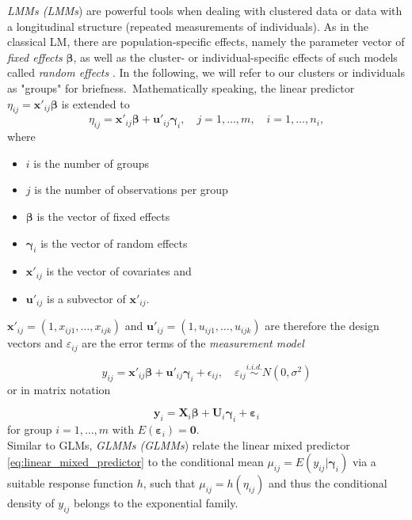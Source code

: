 \textit{\acl{LMM}s (\acs{LMM}s}) are powerful tools when dealing with clustered data or data with a longitudinal structure (repeated measurements of individuals).
As in the classical \acs{LM}, there are population-specific effects, namely the parameter vector of \textit{fixed effects} $\boldsymbol{\beta}$, as well as the cluster- or individual-specific effects of such models called \textit{random effects} \cite{fahrmeir2003regression}. In the following, we will refer to our clusters or individuals as "groups" for briefness.\ Mathematically speaking, the linear predictor $\eta_{ij}= \mathbf{x}'_{ij} \mathbf{\beta} $ is extended to
\begin{equation}
\eta_{ij} = \bm{{x'}}_{ij} \bm{\beta} + \bm{u'}_{ij}\bm{\gamma}_i, \quad j=1, \ldots, m, \quad i=1, \ldots, n_i, 
\label{eq:linear_mixed_predictor}
\end{equation}
where
\begin{itemize}
\item $i$ is the number of groups
\item $j$ is the number of observations per group
\item $\bm{\beta}$ is the vector of fixed effects
\item $\bm{\gamma}_i$ is the vector of random effects
\item $\bm{x'}_{ij}$ is the vector of covariates and
\item $\bm{u'}_{ij}$ is a subvector of $\bm{x'}_{ij}$.
\end{itemize}


$\bm{x'}_{ij} = (1, x_{ij1}, \ldots, x_{ijk}) $ and $ \bm{u'}_{ij} = (1, u_{ij1}, \ldots, u_{ijk}) $ are therefore the design vectors and $\varepsilon_{ij}$ are the error terms of the \textit{measurement model}

\begin{equation}
y_{ij} =  \bm{x'}_{ij} \bm{\beta} + \bm{u'}_{ij} \bm{\gamma}_i + \epsilon_{ij}, \quad \varepsilon_{i j} \overset{i.i.d.} \sim N\left(0, \sigma^{2}\right) 
\end{equation}
or in matrix notation

\begin{equation}
\bm{y}_{i}=\bm{X}_{i} \bm{\beta} + \bm{U}_{i} \bm{\gamma}_{i} + \bm{\varepsilon}_{i}
\end{equation}
for group $ i=1, \ldots, m $ with $ E(\bm{\varepsilon}_{i}) = \bm{0}$. \\

Similar to \acs{GLM}s, \textit{\acl{GLMM}s (\acs{GLMM}s}) relate the linear mixed predictor \ref{eq:linear_mixed_predictor} to the conditional mean 
$ \mu_{ij} = E(y_{ij} | \bm{\gamma}_{i}) $
via a suitable response function $h$, such that
$ \mu_{ij} = h(\eta_{ij}) $ and thus the conditional density of $y_{ij}$ belongs to the exponential family.